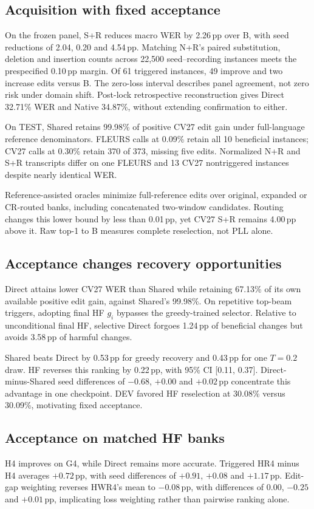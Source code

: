 \subsection{Acquisition with fixed acceptance}

On the frozen panel, S+R reduces macro WER by 2.26\,pp over B, with seed reductions of 2.04, 0.20 and 4.54\,pp. Matching N+R's paired substitution, deletion and insertion counts across 22,500 seed--recording instances meets the prespecified 0.10\,pp margin. Of 61 triggered instances, 49 improve and two increase edits versus B. The zero-loss interval describes panel agreement, not zero risk under domain shift. Post-lock retrospective reconstruction gives Direct 32.71\% WER and Native 34.87\%, without extending confirmation to either.

\pagebreak[4]
On TEST, Shared retains 99.98\% of positive CV27 edit gain under full-language reference denominators. FLEURS calls at 0.09\% retain all 10 beneficial instances; CV27 calls at 0.30\% retain 370 of 373, missing five edits. Normalized N+R and S+R transcripts differ on one FLEURS and 13 CV27 nontriggered instances despite nearly identical WER.

Reference-assisted oracles minimize full-reference edits over original, expanded or CR-routed banks, including concatenated two-window candidates. Routing changes this lower bound by less than 0.01\,pp, yet CV27 S+R remains 4.00\,pp above it. Raw top-1 to B measures complete reselection, not PLL alone.

\subsection{Acceptance changes recovery opportunities}
Direct attains lower CV27 WER than Shared while retaining 67.13\% of its own available positive edit gain, against Shared's 99.98\%. On repetitive top-beam triggers, adopting final HF $g_i$ bypasses the greedy-trained selector. Relative to unconditional final HF, selective Direct forgoes 1.24\,pp of beneficial changes but avoids 3.58\,pp of harmful changes.

Shared beats Direct by 0.53\,pp for greedy recovery and 0.43\,pp for one $T=0.2$ draw. HF reverses this ranking by 0.22\,pp, with 95\% CI [0.11, 0.37]. Direct-minus-Shared seed differences of $-0.68$, $+0.00$ and $+0.02$\,pp concentrate this advantage in one checkpoint. DEV favored HF reselection at 30.08\% versus 30.09\%, motivating fixed acceptance.

\subsection{Acceptance on matched HF banks}

H4 improves on G4, while Direct remains more accurate. Triggered HR4 minus H4 averages $+0.72$\,pp, with seed differences of $+0.91$, $+0.08$ and $+1.17$\,pp. Edit-gap weighting reverses HWR4's mean to $-0.08$\,pp, with differences of $0.00$, $-0.25$ and $+0.01$\,pp, implicating loss weighting rather than pairwise ranking alone.

